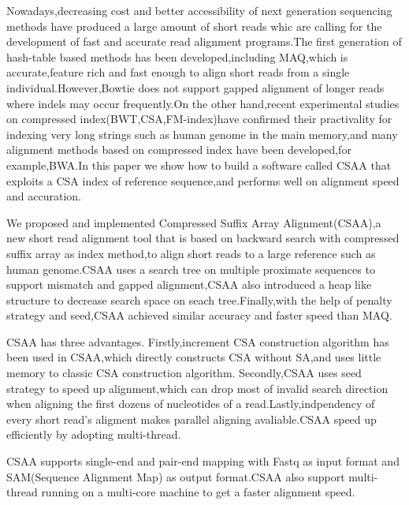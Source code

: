 \begin{englishabstract}

\setlength\parindent{0em}

\vspace{2ex}
Nowadays,decreasing cost and better accessibility of next generation sequencing methods
have produced a large amount of short reads whic are calling for the development of fast
and accurate read alignment programs.The first generation of hash-table based methods has
been developed,including MAQ,which is accurate,feature rich and fast enough to align short
reads from a single individual.However,Bowtie does not support gapped alignment of longer reads
where indels may occur frequently.On the other hand,recent experimental studies on compressed
index(BWT,CSA,FM-index)have confirmed their practivality for indexing very long strings such
as human genome in the main memory,and many alignment methods based on compressed index have
been developed,for example,BWA.In this paper we show how to build a software called CSAA that
exploits a CSA index of reference sequence,and performs well on alignment speed and accuration.

\vspace{2ex}
We proposed and implemented Compressed Suffix Array Alignment(CSAA),a new short read alignment
tool that is based on backward search with compressed suffix array as index method,to align short reads to a
large reference such as human genome.CSAA uses a search tree on multiple proximate sequences to
support mismatch and gapped alignment,CSAA also introduced a heap like structure to decrease
search space on seach tree.Finally,with the help of penalty strategy and seed,CSAA achieved
similar accuracy and faster speed than MAQ.


\vspace{2ex}
CSAA has three advantages. Firstly,increment CSA construction algorithm has been used in
CSAA,which directly constructs CSA without SA,and uses little memory to classic CSA construction algorithm.
Secondly,CSAA uses seed strategy to speed up alignment,which can drop most of invalid
search direction when aligning the first dozens of nucleotides of a read.Lastly,indpendency of
every short read's aligment makes parallel aligning avaliable.CSAA speed up efficiently by
adopting multi-thread.

\vspace{2ex}
CSAA supports single-end and pair-end mapping with Fastq as input format and SAM(Sequence Alignment Map)
as output format.CSAA also support multi-thread running on a multi-core machine to get a faster
alignment speed.




\end{englishabstract}

